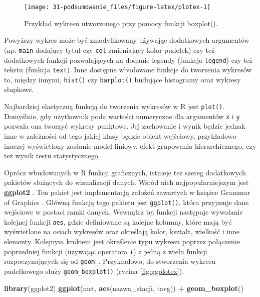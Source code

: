 \documentclass[paper=6in:9in,pagesize=pdftex,headinclude=on,footinclude=on,10pt]{scrbook}
\newenvironment{Shaded}{\begin{snugshade}}{\end{snugshade}}
\newcommand{\KeywordTok}[1]{\textcolor[rgb]{0.13,0.29,0.53}{\textbf{#1}}}
\newcommand{\NormalTok}[1]{#1}
\newcommand{\OperatorTok}[1]{\textcolor[rgb]{0.81,0.36,0.00}{\textbf{#1}}}
\newcommand{\StringTok}[1]{\textcolor[rgb]{0.31,0.60,0.02}{#1}}
\begin{document}
\begin{figure}[H]

{\centering \texttt{[image: 31-podsumowanie\_files/figure-latex/plotex-1]} 

}

\caption{Przykład wykresu utworzonego przy pomocy funkcji boxplot().}\label{fig:plotex}
\end{figure}

Powyższy wykres może być zmodyfikowany używając dodatkowych argumentów (np. \texttt{main} dodający tytuł czy \texttt{col} zmieniający kolor pudełek) czy też dodatkowych funkcji pozwalających na dodanie legendy (funkcja \texttt{legend}) czy też tekstu (funkcja \texttt{text}).
Inne dostępne wbudowane funkcje do tworzenia wykresów to, między innymi, \texttt{hist()} czy \texttt{barplot()} budujące histogramy oraz wykresy słupkowe.

Najbardziej elastyczną funkcją do tworzenia wykresów w R jest \texttt{plot()}.
Domyślnie, gdy użytkownik poda wartości numeryczne dla argumentów \texttt{x} i \texttt{y} pozwala ona tworzyć wykresy punktowe.
Jej zachowanie i wynik będzie jednak inne w zależności od tego jakiej klasy będzie obiekt wejściowy, przykładowo inaczej wyświetlony zostanie model liniowy, efekt grupowania hierarchicznego, czy też wynik testu statystycznego.

Oprócz wbudowanych w R funkcji graficznych, istnieje też szereg dodatkowych pakietów służących do wizualizacji danych.
Wśród nich najpopularniejszym jest \textbf{ggplot2} \citep{R-ggplot2}.
Ten pakiet jest implementacją założeń zawartych w książce Grammar of Graphics \citep{wilkinsonGrammarGraphics2005}.
Główną funkcją tego pakietu jest \texttt{ggplot()}, która przyjmuje dane wejściowe w postaci ramki danych.
Wewnątrz tej funkcji następuje wywołanie kolejnej funkcji \texttt{aes}, gdzie definiowane są kolejne kolumny, które mają być wyświetlone na osiach wykresów oraz określają kolor, kształt, wielkość i inne elementy.
Kolejnym krokiem jest określenie typu wykresu poprzez połączenie poprzedniej funkcji (używając operatora \texttt{+}) z jedną z wielu funkcji rozpoczynających się od \texttt{geom\_}.
Przykładowo, do stworzenia wykresu pudełkowego służy \texttt{geom\_boxplot()} (rycina \ref{fig:ggplotex}).

\begin{Shaded}
\begin{Highlighting}[]
\KeywordTok{library}\NormalTok{(ggplot2)}
\KeywordTok{ggplot}\NormalTok{(met, }\KeywordTok{aes}\NormalTok{(nazwa_stacji, tavg)) }\OperatorTok{+}\StringTok{ }\KeywordTok{geom_boxplot}\NormalTok{()}
\end{Highlighting}
\end{Shaded}
\end{document}
